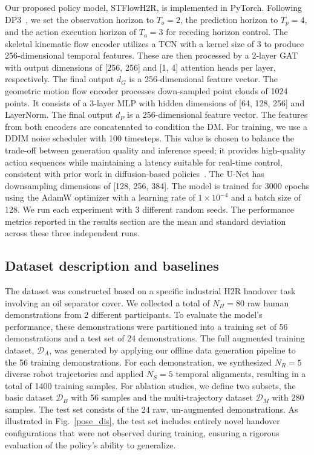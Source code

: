 \documentclass[final,5p,times,twocolumn]{elsarticle}
\begin{document}
Our proposed policy model, STFlowH2R, is implemented in PyTorch. Following DP3~\cite{Ze2024DP3}, we set the observation horizon to $T_o=2$, the prediction horizon to $T_p=4$, and the action execution horizon of $T_a=3$ for receding horizon control. The skeletal kinematic flow encoder utilizes a TCN with a kernel size of 3 to produce 256-dimensional temporal features. These are then processed by a 2-layer GAT with output dimensions of [256, 256] and [1, 4] attention heads per layer, respectively. The final output $d_G$ is a 256-dimensional feature vector. The geometric motion flow encoder processes down-sampled point clouds of 1024 points. It consists of a 3-layer MLP with hidden dimensions of [64, 128, 256] and LayerNorm. The final output $d_P$ is a 256-dimensional feature vector. The features from both encoders are concatenated to condition the DM. For training, we use a DDIM noise scheduler with 100 timesteps. This value is chosen to balance the trade-off between generation quality and inference speed; it provides high-quality action sequences while maintaining a latency suitable for real-time control, consistent with prior work in diffusion-based policies~\cite{chi2023diffusion}. The U-Net has downsampling dimensions of [128, 256, 384]. The model is trained for 3000 epochs using the AdamW optimizer with a learning rate of $1 \times 10^{-4}$ and a batch size of 128. We run each experiment with 3 different random seeds. The performance metrics reported in the results section are the mean and standard deviation across these three independent runs.


\subsection{Dataset description and baselines}  \label{dataset}

The dataset was constructed based on a specific industrial H2R handover task involving an oil separator cover. We collected a total of $N_H=80$ raw human demonstrations from 2 different participants. To evaluate the model's performance, these demonstrations were partitioned into a training set of 56 demonstrations and a test set of 24 demonstrations. The full augmented training dataset, $\mathcal{D}_A$, was generated by applying our offline data generation pipeline to the 56 training demonstrations. For each demonstration, we synthesized $N_R = 5$ diverse robot trajectories and applied $N_S = 5$ temporal alignments, resulting in a total of 1400 training samples. For ablation studies, we define two subsets, the basic dataset $\mathcal{D}_B$ with 56 samples and the multi-trajectory dataset $\mathcal{D}_M$ with 280 samples. The test set consists of the 24 raw, un-augmented demonstrations. As illustrated in Fig.~\ref{pose_dis}, the test set includes entirely novel handover configurations that were not observed during training, ensuring a rigorous evaluation of the policy's ability to generalize.
\end{document}
